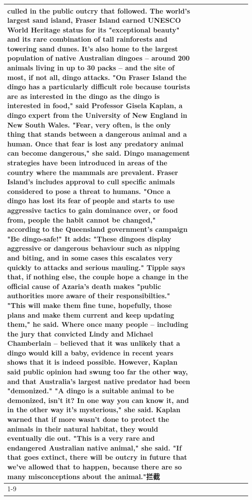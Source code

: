 \begin{table}[H]
\begin{tabular}{lllrlllll}
culled in the public outcry that followed. The world's largest sand island, Fraser Island earned UNESCO World Heritage status for its "exceptional beauty" and its rare combination of tall rainforests and towering sand dunes. It's also home to the largest population of native Australian dingoes -- around 200 animals living in up to 30 packs -- and the site of most, if not all, dingo attacks. "On Fraser Island the dingo has a particularly difficult role because tourists are as interested in the dingo as the dingo is interested in food," said Professor Gisela Kaplan, a dingo expert from the University of New England in New South Wales. "Fear, very often, is the only thing that stands between a dangerous animal and a human. Once that fear is lost any predatory animal can become dangerous," she said. Dingo management strategies have been introduced in areas of the country where the mammals are prevalent. Fraser Island's includes approval to cull specific animals considered to pose a threat to humans. "Once a dingo has lost its fear of people and starts to use aggressive tactics to gain dominance over, or food from, people the habit cannot be changed," according to the Queensland government's campaign "Be dingo-safe!" It adds: "These dingoes display aggressive or dangerous behaviour such as nipping and biting, and in some cases this escalates very quickly to attacks and serious mauling." Tipple says that, if nothing else, the couple hope a change in the official cause of Azaria's death makes "public authorities more aware of their responsibilties." "This will make them fine tune, hopefully, those plans and make them current and keep updating them," he said. Where once many people -- including the jury that convicted Lindy and Michael Chamberlain -- believed that it was unlikely that a dingo would kill a baby, evidence in recent years shows that it is indeed possible. However, Kaplan said public opinion had swung too far the other way, and that Australia's largest native predator had been "demonized." "A dingo is a suitable animal to be demonized, isn't it? In one way you can know it, and in the other way it's mysterious," she said. Kaplan warned that if more wasn't done to protect the animals in their natural habitat, they would eventually die out. "This is a very rare and endangered Australian native animal," she said. "If that goes extinct, there will be outcry in future that we've allowed that to happen, because there are so many misconceptions about the animal."拦截 \\
\cline{1-9}

\end{tabular}
\end{table}

